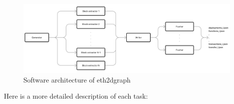 \begin{figure}[H]
  \centering
  \includegraphics[width=1\textwidth]{Figures/methods/software-architecture.jpg}
  \caption[Software architecture of eth2dgraph]{Software architecture of eth2dgraph}
  \label{fig:eth2dgraph-architecture}
\end{figure}

Here is a more detailed description of each task:

